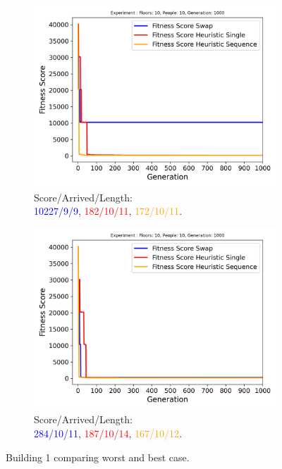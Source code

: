 \begin{figure}[ht]
	\centering
	\begin{subfigure}[b]{0.49\linewidth}
		\centering
		\includegraphics[width=\linewidth]{results/Building1/Mutation_0.1/Floors: 10, People: 10, Generation: 1000_worst.png}
		\captionsetup{justification=centering,font=tiny}
		\caption{Score/Arrived/Length:\\\textcolor{blue}{10227/9/9}, \textcolor{red}{182/10/11}, \textcolor{orange}{172/10/11}.}
		\label{fig:Building1/Mutation_0.1/Floors: 10, People: 10, Generation: 1000_worst}
	\end{subfigure}
	\hfill
	\begin{subfigure}[b]{0.49\linewidth}
		\centering
		\includegraphics[width=\linewidth]{results/Building1/Mutation_0.1/Floors: 10, People: 10, Generation: 1000_best.png}
		\captionsetup{justification=centering,font=tiny}
		\caption{Score/Arrived/Length:\\\textcolor{blue}{284/10/11}, \textcolor{red}{187/10/14}, \textcolor{orange}{167/10/12}.}
		\label{fig:Building1/Mutation_0.1/Floors: 10, People: 10, Generation: 1000_best}
	\end{subfigure}
	\label{fig:Building 1 results}
	\captionsetup{font=scriptsize}
	\caption{Building 1 comparing worst and best case.}
\end{figure}
